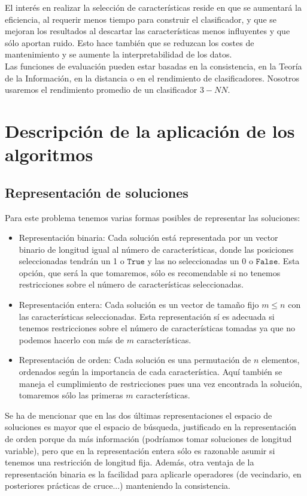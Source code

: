 \documentclass[11pt,leqno]{article}
\begin{document}
El interés en realizar la selección de características reside en que se aumentará la eficiencia, al requerir menos tiempo para construir el clasificador, y que se mejoran los resultados al descartar las características menos influyentes y que sólo aportan ruido. Esto hace también que se reduzcan los costes de mantenimiento y se aumente la interpretabilidad de los datos.\\
Las funciones de evaluación pueden estar basadas en la consistencia, en la Teoría de la Información, en la distancia o en el rendimiento de clasificadores. Nosotros usaremos el rendimiento promedio de un clasificador $3-NN$.


\section{Descripción de la aplicación de los algoritmos}
\subsection{Representación de soluciones}
	Para este problema tenemos varias formas posibles de representar las soluciones:
	\begin{itemize}
		\item Representación binaria: Cada solución está representada por un vector binario de longitud igual al número de características, donde las posiciones seleccionadas tendrán un 1 o $\texttt{True}$ y las no seleccionadas un 0 o $\texttt{False}$. Esta opción, que será la que tomaremos, sólo es recomendable si no tenemos restricciones sobre el número de características seleccionadas.
		\item Representación entera: Cada solución es un vector de tamaño fijo $m \leq n$ con las características seleccionadas. Esta representación sí es adecuada si tenemos restricciones sobre el número de características tomadas ya que no podemos hacerlo con más de $m$ características.
		\item Representación de orden: Cada solución es una permutación de $n$ elementos, ordenados según la importancia de cada característica. Aquí también se maneja el cumplimiento de restricciones pues una vez encontrada la solución, tomaremos sólo las primeras $m$ características.
	\end{itemize}
	Se ha de mencionar que en las dos últimas representaciones el espacio de soluciones es mayor que el espacio de búsqueda, justificado en la representación de orden porque da más información (podríamos tomar soluciones de longitud variable), pero que en la representación entera sólo es razonable asumir si tenemos una restricción de longitud fija. Además, otra ventaja de la representación binaria es la facilidad para aplicarle operadores (de vecindario, en posteriores prácticas de cruce...) manteniendo la consistencia.
\end{document}
